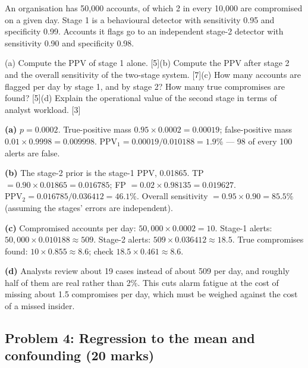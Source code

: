 \documentclass[11pt]{article}
\begin{document}
\begin{prob}An organisation has 50,000 accounts, of which 2 in every 10,000 are compromised on a given day. Stage 1 is a behavioural detector with sensitivity 0.95 and specificity 0.99. Accounts it flags go to an independent stage-2 detector with sensitivity 0.90 and specificity 0.98.

(a) Compute the PPV of stage 1 alone. [5]\newline (b) Compute the PPV after stage 2 and the overall sensitivity of the two-stage system. [7]\newline (c) How many accounts are flagged per day by stage 1, and by stage 2? How many true compromises are found? [5]\newline (d) Explain the operational value of the second stage in terms of analyst workload. [3]\end{prob}

\begin{soln}\textbf{(a)} $p=0.0002$. True-positive mass $0.95\times0.0002=0.00019$; false-positive mass $0.01\times0.9998=0.009998$. $\text{PPV}_1=0.00019/0.010188=\mathbf{1.9\%}$ --- 98 of every 100 alerts are false.

\textbf{(b)} The stage-2 prior is the stage-1 PPV, 0.01865. TP $=0.90\times0.01865=0.016785$; FP $=0.02\times0.98135=0.019627$. $\text{PPV}_2=0.016785/0.036412=\mathbf{46.1\%}$. Overall sensitivity $=0.95\times0.90=\mathbf{85.5\%}$ (assuming the stages' errors are independent).

\textbf{(c)} Compromised accounts per day: $50{,}000\times0.0002=10$. Stage-1 alerts: $50{,}000\times0.010188\approx509$. Stage-2 alerts: $509\times0.036412\approx18.5$. True compromises found: $10\times0.855\approx8.6$; check $18.5\times0.461\approx8.6$.

\textbf{(d)} Analysts review about 19 cases instead of about 509 per day, and roughly half of them are real rather than 2\%. This cuts alarm fatigue at the cost of missing about 1.5 compromises per day, which must be weighed against the cost of a missed insider.\end{soln}

\subsection{Problem 4: Regression to the mean and confounding \normalfont\small\color{GreyN}(20 marks)}
\end{document}
